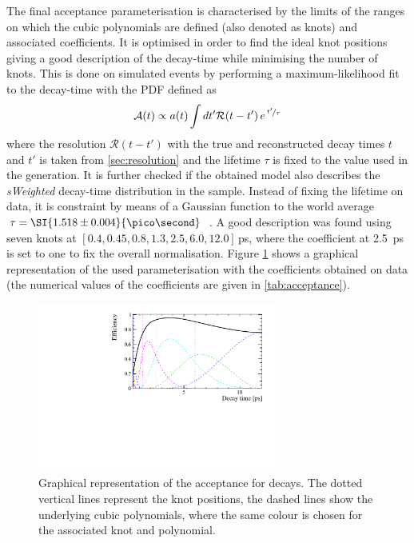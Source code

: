 The final acceptance parameterisation is characterised by the limits of the ranges on which the cubic polynomials are defined (also denoted as knots) and associated coefficients.
It is optimised in order to find the ideal knot positions giving a good description of the decay-time while minimising the number of knots.
This is done on simulated \BdToDpi events by performing a maximum-likelihood fit to the decay-time with the PDF defined as
\begin{equation}
\mathcal{A}(t)\propto a(t)\int dt' \mathcal{R}\!\left(t-t'\right)e^{\,\nicefrac{t'}{\tau}}
\end{equation}
where the resolution $\mathcal{R}\!\left(t-t'\right)$ with the true and reconstructed decay times $t$ and $t'$ is taken from \cref{sec:resolution} and the lifetime $\tau$ is fixed to the value used in the generation.
It is further checked if the obtained model also describes the \emph{sWeighted} decay-time distribution in the \BdToDpi sample.
Instead of fixing the lifetime on data, it is constraint by means of a Gaussian function to the world average $\tau=\SI{1.518\pm0.004}{\pico\second}$~\cite{PDG2018}.
A good description was found using seven knots at $[0.4, 0.45, 0.8, 1.3, 2.5, 6.0, 12.0]\,$\si{\pico\second}, where the coefficient at \SI{2.5}{\pico\second} is set to one to fix the overall normalisation.
Figure \ref{fig:acceptance} shows a graphical representation of the used parameterisation with the coefficients obtained on \BdToDpi data (the numerical values of the coefficients are given in \cref{tab:acceptance}).
\begin{figure}[tbp]
    \centering
    \includegraphics[width=0.7\textwidth]{10TimeFit/figs/Acceptance.pdf}
    \caption{Graphical representation of the acceptance for \BdToDpi decays.
    The dotted vertical lines represent the knot positions, the dashed lines show the underlying cubic polynomials, where the same colour is chosen for the associated knot and polynomial.}
    \label{fig:acceptance}
\end{figure}
